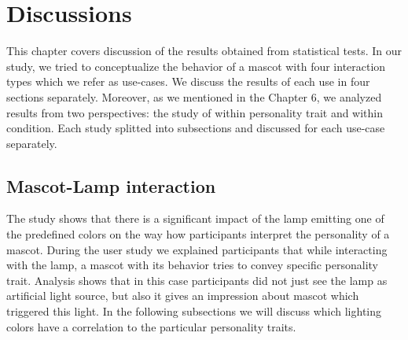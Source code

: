 \chapter{Discussions}
This chapter covers discussion of the results obtained from statistical tests. In our study, we tried to conceptualize the behavior of a mascot with four interaction types which we refer as use-cases. We discuss the results of each use in four sections separately. Moreover, as we mentioned in the Chapter 6, we analyzed results from two perspectives: the study of within personality trait and within condition. Each study splitted into subsections and discussed for each use-case separately.

\section{Mascot-Lamp interaction}
The study shows that there is a significant impact of the lamp emitting one of the predefined colors on the way how participants interpret the personality of a mascot. During the user study we explained participants that while interacting with the lamp, a mascot with its behavior tries to convey specific personality trait. Analysis shows that in this case participants did not just see the lamp as artificial light source, but also it gives an impression about mascot which triggered this light. In the following subsections we will discuss which lighting colors have a correlation to the particular personality traits.
